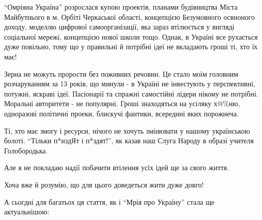 \enquote{Омріяна Україна} розрослася купою проектів, планами будівництва Міста
Майбутнього в м. Орбіті Черкаської області, концепцією Безумовного освноного
доходу, моделлю цифрової самоорганізації, яка зараз втілюється у вигляді
соціальної мережі, концепцією нової школи тощо. Однак, в Україні все рухається
дуже повільно, тому що у правильні й потрібні ідеї не вкладають гроші ті, хто
їх має! 

Зерна не можуть прорости без поживних речовин. Це стало моїм головним
розчаруванням за 13 років, що минули -  в Україні не інвестують у перспективні,
потужні, яскраві ідеї. Пасіонарії та спражні самостійні лідери нікому не
потрібні. Моральні авторитети - не популярні. Гроші знаходяться на усіляку
х@\%ню, одноразові політичні проеки, блискучі фантики, всередині яких порожнеча. 

Ті, хто має змогу і ресурси, нічого не хочуть змінювати у нашому українською
болоті. \enquote{Тільки п*издЯт і п*здят!}, як казав наш Слуга Народу в образі учителя
Голобородька. 

Але я не покладаю надії побачити втілення усіх ідей ще за свого життя. 

Хоча вже й розумію, що для цього доведеться жити дуже довго!

А сьогдні для багатьох ця стаття, як і \enquote{Мрія про Україну} стала ще
актуальнішою:



